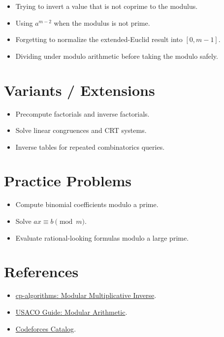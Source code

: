 \begin{itemize}
  \item Trying to invert a value that is not coprime to the modulus.
  \item Using \(a^{m-2}\) when the modulus is not prime.
  \item Forgetting to normalize the extended-Euclid result into \([0, m-1]\).
  \item Dividing under modulo arithmetic before taking the modulo safely.
\end{itemize}

\section*{Variants / Extensions}

\begin{itemize}
  \item Precompute factorials and inverse factorials.
  \item Solve linear congruences and CRT systems.
  \item Inverse tables for repeated combinatorics queries.
\end{itemize}

\section*{Practice Problems}

\begin{itemize}
  \item Compute binomial coefficients modulo a prime.
  \item Solve \(ax \equiv b \pmod m\).
  \item Evaluate rational-looking formulas modulo a large prime.
\end{itemize}

\section*{References}

\begin{itemize}
  \item \href{https://cp-algorithms.com/algebra/module-inverse.html}{cp-algorithms: Modular Multiplicative Inverse}.
  \item \href{https://usaco.guide/gold/modular?lang=cpp}{USACO Guide: Modular Arithmetic}.
  \item \href{https://codeforces.com/catalog}{Codeforces Catalog}.
\end{itemize}
